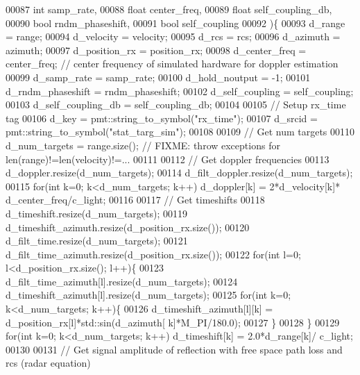 \begin{DoxyCode}
00087         \textcolor{keywordtype}{int} samp_rate,
00088         \textcolor{keywordtype}{float} center_freq,
00089         \textcolor{keywordtype}{float} self\_coupling\_db,
00090         \textcolor{keywordtype}{bool} rndm\_phaseshift,
00091         \textcolor{keywordtype}{bool} self\_coupling
00092     )\{
00093         d_range = range;
00094         d_velocity = velocity;
00095         d_rcs = rcs;
00096         d_azimuth = azimuth;
00097         d_position_rx = position\_rx;
00098         d_center_freq = center_freq; \textcolor{comment}{// center frequency of simulated hardware for doppler estimation}
00099         d_samp_rate = samp_rate;
00100         d_hold_noutput = -1;
00101         d_rndm_phaseshift = rndm\_phaseshift;
00102         d_self_coupling = self\_coupling;
00103         d_self_coupling_db = self\_coupling\_db;
00104 
00105         \textcolor{comment}{// Setup rx\_time tag}
00106         d_key = pmt::string\_to\_symbol(\textcolor{stringliteral}{"rx\_time"});
00107         d_srcid = pmt::string\_to\_symbol(\textcolor{stringliteral}{"stat\_targ\_sim"});
00108 
00109         \textcolor{comment}{// Get num targets}
00110         d_num_targets = range.size(); \textcolor{comment}{// FIXME: throw exceptions for len(range)!=len(velocity)!=...}
00111 
00112         \textcolor{comment}{// Get doppler frequencies}
00113         d_doppler.resize(d_num_targets);
00114         d_filt_doppler.resize(d_num_targets);
00115         \textcolor{keywordflow}{for}(\textcolor{keywordtype}{int} k=0; k<d_num_targets; k++) d_doppler[k] = 2*d_velocity[k]*
      d_center_freq/c_light;
00116 
00117         \textcolor{comment}{// Get timeshifts}
00118         d_timeshift.resize(d\_num\_targets);
00119         d_timeshift_azimuth.resize(d_position_rx.size());
00120         d_filt_time.resize(d\_num\_targets);
00121         d_filt_time_azimuth.resize(d_position_rx.size());
00122         \textcolor{keywordflow}{for}(\textcolor{keywordtype}{int} l=0; l<d_position_rx.size(); l++)\{
00123             d_filt_time_azimuth[l].resize(d\_num\_targets);
00124             d_timeshift_azimuth[l].resize(d\_num\_targets);
00125             \textcolor{keywordflow}{for}(\textcolor{keywordtype}{int} k=0; k<d_num_targets; k++)\{
00126                 d_timeshift_azimuth[l][k] = d_position_rx[l]*std::sin(d_azimuth[
      k]*M\_PI/180.0);
00127             \}
00128         \}
00129         \textcolor{keywordflow}{for}(\textcolor{keywordtype}{int} k=0; k<d_num_targets; k++) d_timeshift[k] = 2.0*d_range[k]/
      c_light;
00130 
00131         \textcolor{comment}{// Get signal amplitude of reflection with free space path loss and rcs (radar equation)}

\end{DoxyCode}
